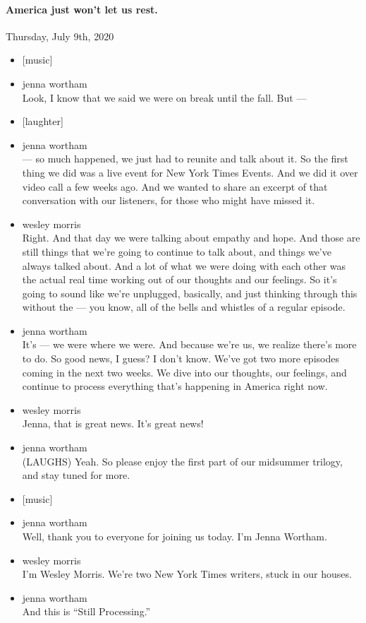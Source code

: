 \hypertarget{america-just-wont-let-us-rest-2}{%
\paragraph{America just won't let us
rest.}\label{america-just-wont-let-us-rest-2}}

Thursday, July 9th, 2020

\begin{itemize}
\item
  {[}music{]}
\item
  jenna wortham\\
  Look, I know that we said we were on break until the fall. But ---
\item
  {[}laughter{]}
\item
  jenna wortham\\
  --- so much happened, we just had to reunite and talk about it. So the
  first thing we did was a live event for New York Times Events. And we
  did it over video call a few weeks ago. And we wanted to share an
  excerpt of that conversation with our listeners, for those who might
  have missed it.
\item
  wesley morris\\
  Right. And that day we were talking about empathy and hope. And those
  are still things that we're going to continue to talk about, and
  things we've always talked about. And a lot of what we were doing with
  each other was the actual real time working out of our thoughts and
  our feelings. So it's going to sound like we're unplugged, basically,
  and just thinking through this without the --- you know, all of the
  bells and whistles of a regular episode.
\item
  jenna wortham\\
  It's --- we were where we were. And because we're us, we realize
  there's more to do. So good news, I guess? I don't know. We've got two
  more episodes coming in the next two weeks. We dive into our thoughts,
  our feelings, and continue to process everything that's happening in
  America right now.
\item
  wesley morris\\
  Jenna, that is great news. It's great news!
\item
  jenna wortham\\
  (LAUGHS) Yeah. So please enjoy the first part of our midsummer
  trilogy, and stay tuned for more.
\item
  {[}music{]}
\item
  jenna wortham\\
  Well, thank you to everyone for joining us today. I'm Jenna Wortham.
\item
  wesley morris\\
  I'm Wesley Morris. We're two New York Times writers, stuck in our
  houses.
\item
  jenna wortham\\
  And this is ``Still Processing.''
\end{itemize}

